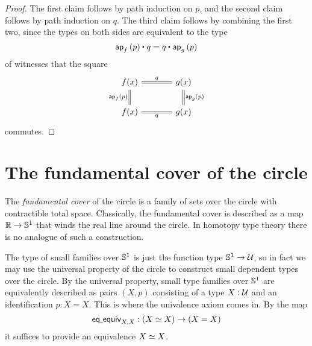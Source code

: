 \begin{proof}
The first claim follows by path induction on $p$, and the second claim follows by path induction on $q$. The third claim follows by combining the first two, since the types on both sides are equivalent to the type
\begin{equation*}
\ct{\ap{f}{p}}{q}=\ct{q}{\ap{g}{p}}
\end{equation*}
of witnesses that the square
\begin{equation*}
\begin{tikzcd}[column sep=large]
f(x) \arrow[r,equals,"q"] \arrow[d,swap,equals,"\ap{f}{p}"] & g(x) \arrow[d,equals,"\ap{g}{p}"] \\
f(x) \arrow[r,equals,swap,"q"] & g(x)
\end{tikzcd}
\end{equation*}
commutes.
\end{proof}

\section{The fundamental cover of the circle}

The \emph{fundamental cover} of the circle is a family of sets over the circle with contractible total space.
Classically, the fundamental cover is described as a map $\mathbb{R}\to\mathbb{S}^{1}$ that winds the real line around the circle.
In homotopy type theory there is no analogue of such a construction.

The type of small families over $\mathbb{S}^{1}$ is just the function type $\mathbb{S}^{1}\to\mathcal{U}$, so in fact we may use the universal property of the circle to construct small dependent types over the circle. 
By the universal property, small type families over $\mathbb{S}^{1}$ are equivalently described as pairs $(X,p)$ consisting of a type $X:\mathcal{U}$ and an identification $p:X=X$.
This is where the univalence axiom comes in. By the map
\begin{equation*}
\mathsf{eq\usc{}equiv}_{X,X}:(\eqv{X}{X})\to (X=X)
\end{equation*}
it suffices to provide an equivalence $\eqv{X}{X}$.

